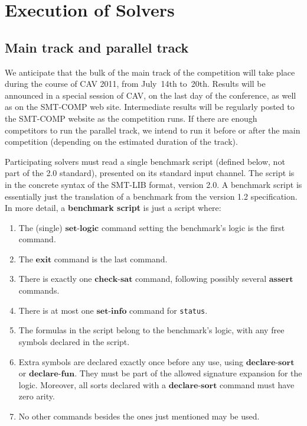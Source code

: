 \documentclass[12pt]{article}
\newcommand{\akey}[1]{\textbf{#1}}
\begin{document}
\section{Execution of Solvers}
\label{sec:exec}

\subsection{Main track and parallel track}
\label{sec:exec:main}

%
We anticipate that the bulk of the main track of the competition will take place during
the course of CAV 2011, from July~14th to~20th.  Results will be
announced in a special session of CAV, on the last day of the
conference, as well as on the SMT-COMP web site.  Intermediate results
will be regularly posted to the SMT-COMP website as the competition
runs.
%
If there are enough competitors to run the parallel track, we intend
to run it before or after the main competition (depending on the
estimated duration of the track).

%
Participating solvers must read a single benchmark script (defined
below, not part of the 2.0 standard), presented on its standard input
channel. The script is in the concrete syntax of the SMT-LIB format,
version 2.0.  A benchmark script is essentially just the translation
of a benchmark from the version 1.2 specification.  In more detail, a
\textbf{benchmark script} is just a script where:

\begin{enumerate}
\item The (single) $\akey{set-logic}$ command setting the benchmark's
logic is the first command.
\item The $\akey{exit}$ command is the last command.
\item There is exactly one $\akey{check-sat}$ command,
following possibly several $\akey{assert}$ commands.
\item There is at most one $\akey{set-info}$ command for \texttt{status}.
\item The formulas in the script belong to the benchmark's logic, with
any free symbols declared in the script.
\item Extra symbols are declared exactly once before any
  use, using $\akey{declare-sort}$
  or $\akey{declare-fun}$.
  They must be part of the allowed signature expansion for the logic.
  Moreover, all sorts declared with a $\akey{declare-sort}$ command must have zero arity.
\item No other commands besides the ones just mentioned may be used.
\end{enumerate}
\end{document}
